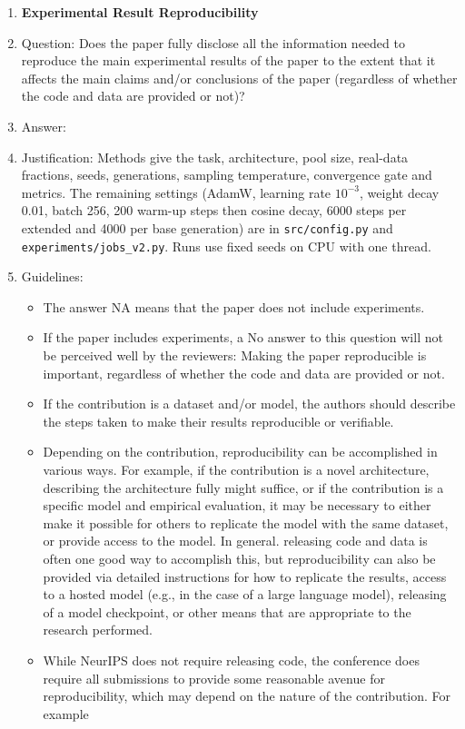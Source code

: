 \begin{enumerate}
    \item {\bf Experimental Result Reproducibility}
    \item[] Question: Does the paper fully disclose all the information needed to reproduce the main experimental results of the paper to the extent that it affects the main claims and/or conclusions of the paper (regardless of whether the code and data are provided or not)?
    \item[] Answer: \answerYes{}
    \item[] Justification: Methods give the task, architecture, pool size, real-data fractions, seeds, generations, sampling temperature, convergence gate and metrics. The remaining settings (AdamW, learning rate $10^{-3}$, weight decay 0.01, batch 256, 200 warm-up steps then cosine decay, 6000 steps per extended and 4000 per base generation) are in \texttt{src/config.py} and \texttt{experiments/jobs\_v2.py}. Runs use fixed seeds on CPU with one thread.
    \item[] Guidelines:
    \begin{itemize}
        \item The answer NA means that the paper does not include experiments.
        \item If the paper includes experiments, a No answer to this question will not be perceived well by the reviewers: Making the paper reproducible is important, regardless of whether the code and data are provided or not.
        \item If the contribution is a dataset and/or model, the authors should describe the steps taken to make their results reproducible or verifiable.
        \item Depending on the contribution, reproducibility can be accomplished in various ways. For example, if the contribution is a novel architecture, describing the architecture fully might suffice, or if the contribution is a specific model and empirical evaluation, it may be necessary to either make it possible for others to replicate the model with the same dataset, or provide access to the model. In general. releasing code and data is often one good way to accomplish this, but reproducibility can also be provided via detailed instructions for how to replicate the results, access to a hosted model (e.g., in the case of a large language model), releasing of a model checkpoint, or other means that are appropriate to the research performed.
        \item While NeurIPS does not require releasing code, the conference does require all submissions to provide some reasonable avenue for reproducibility, which may depend on the nature of the contribution. For example

\end{itemize}
\end{enumerate}

